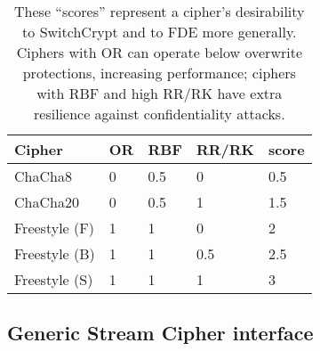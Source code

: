 \begin{table}[]
  \begin{tabular}{@{}lllll@{}}
  \toprule
  \textbf{Cipher} & \textbf{OR} & \textbf{RBF} & \textbf{RR/RK} & \textbf{score} \\ \midrule
  ChaCha8         & 0           & 0.5          & 0              & 0.5            \\
  ChaCha20        & 0           & 0.5          & 1              & 1.5            \\
  Freestyle (F)   & 1           & 1            & 0              & 2              \\
  Freestyle (B)   & 1           & 1            & 0.5            & 2.5            \\
  Freestyle (S)   & 1           & 1            & 1              & 3
  \end{tabular}
  \caption{These ``scores'' represent a cipher's desirability to SwitchCrypt and
  to FDE more generally. Ciphers with OR can operate below overwrite
  protections, increasing performance; ciphers with RBF and high RR/RK have
  extra resilience against confidentiality attacks.}
  \label{tbl:security-quant}
\end{table}

\subsection{Generic Stream Cipher interface} \label{subsec:interface}

